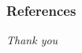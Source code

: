 \if{}
\begin{frame}[allowframebreaks]
  \frametitle{References}
  \printbibliography
\end{frame}
\fi

\begin{frame}{}
\centering \Large
\emph{Thank you}
\end{frame}